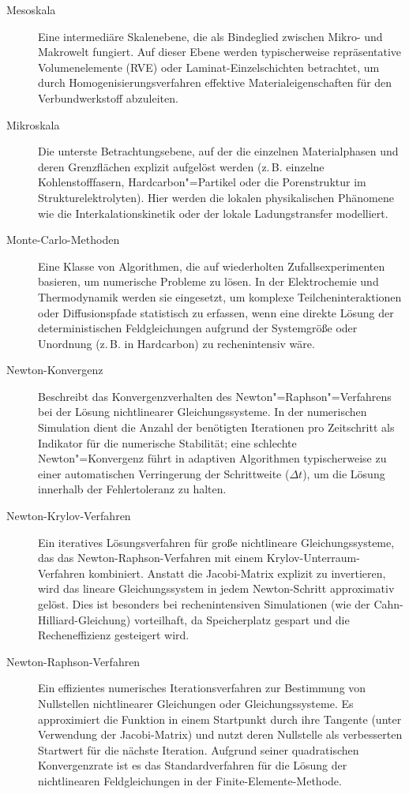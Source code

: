 \begin{description}
    \item[Mesoskala] Eine intermediäre Skalenebene, die als Bindeglied zwischen Mikro- und Makrowelt fungiert. Auf dieser Ebene werden typischerweise repräsentative Volumenelemente (RVE) oder Laminat-Einzelschichten betrachtet, um durch Homogenisierungsverfahren effektive Materialeigenschaften für den Verbundwerkstoff abzuleiten.
    
    \item[Mikroskala] Die unterste Betrachtungsebene, auf der die einzelnen Materialphasen und deren Grenzflächen explizit aufgelöst werden (z.\,B. einzelne Kohlenstofffasern, Hardcarbon"=Partikel oder die Porenstruktur im Strukturelektrolyten). Hier werden die lokalen physikalischen Phänomene wie die Interkalationskinetik oder der lokale Ladungstransfer modelliert.
    
    \item[Monte-Carlo-Methoden] Eine Klasse von Algorithmen, die auf wiederholten Zufallsexperimenten basieren, um numerische Probleme zu lösen. In der Elektrochemie und Thermodynamik werden sie eingesetzt, um komplexe Teilcheninteraktionen oder Diffusionspfade statistisch zu erfassen, wenn eine direkte Lösung der deterministischen Feldgleichungen aufgrund der Systemgröße oder Unordnung (z.\,B. in Hardcarbon) zu rechenintensiv wäre.
    
    \item[Newton-Konvergenz] Beschreibt das Konvergenzverhalten des Newton"=Raphson"=Verfahrens bei der Lösung nichtlinearer Gleichungssysteme. In der numerischen Simulation dient die Anzahl der benötigten Iterationen pro Zeitschritt als Indikator für die numerische Stabilität; eine schlechte Newton"=Konvergenz führt in adaptiven Algorithmen typischerweise zu einer automatischen Verringerung der Schrittweite ($\Delta t$), um die Lösung innerhalb der Fehlertoleranz zu halten.

    \item[Newton-Krylov-Verfahren] Ein iteratives Lösungsverfahren für große nichtlineare Gleichungssysteme, das das Newton-Raphson-Verfahren mit einem Krylov-Unterraum-Verfahren kombiniert. Anstatt die Jacobi-Matrix explizit zu invertieren, wird das lineare Gleichungssystem in jedem Newton-Schritt approximativ gelöst. Dies ist besonders bei rechenintensiven Simulationen (wie der Cahn-Hilliard-Gleichung) vorteilhaft, da Speicherplatz gespart und die Recheneffizienz gesteigert wird.
    
    \item[Newton-Raphson-Verfahren] Ein effizientes numerisches Iterationsverfahren zur Bestimmung von Nullstellen nichtlinearer Gleichungen oder Gleichungssysteme. Es approximiert die Funktion in einem Startpunkt durch ihre Tangente (unter Verwendung der Jacobi-Matrix) und nutzt deren Nullstelle als verbesserten Startwert für die nächste Iteration. Aufgrund seiner quadratischen Konvergenzrate ist es das Standardverfahren für die Lösung der nichtlinearen Feldgleichungen in der Finite-Elemente-Methode.


\end{description}
